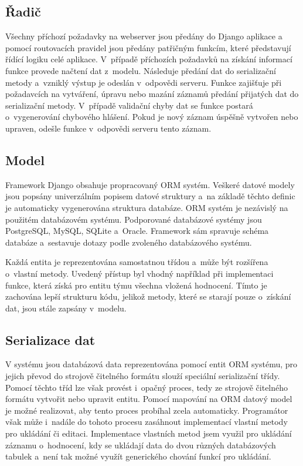 \documentclass[
  digital,
  twoside,
  table, 
  nolof, 
  nolot
]{fithesis3}
\begin{document}
\subsection{Řadič}
\label{radic}
Všechny příchozí požadavky na webserver jsou předány do Django aplikace a pomocí routovacích pravidel jsou předány patřičným funkcím, které představují řídící logiku celé aplikace. V~případě příchozích požadavků na získání informací funkce provede načtení dat z~modelu. Následuje předání dat do serializační metody a~vzniklý výstup je odeslán v~odpovědi serveru. Funkce zajišťuje při požadavcích na vytváření, úpravu nebo mazání záznamů předání přijatých dat do serializační metody. V~případě validační chyby dat se funkce postará o~vygenerování chybového hlášení. Pokud je nový záznam úspěšně vytvořen nebo upraven, odešle funkce v~odpovědi serveru tento záznam.

\subsection{Model}
\label{model}
Framework Django obsahuje propracovaný ORM systém. Veškeré datové modely jsou popsány univerzálním popisem datové struktury a~na základě těchto definic je automaticky vygenerována struktura databáze. ORM systém je nezávislý na použitém databázovém systému. Podporované databázové systémy jsou PostgreSQL, MySQL, SQLite a~Oracle. Framework sám spravuje schéma databáze a~sestavuje dotazy podle zvoleného databázového systému.

Každá entita je reprezentována samostatnou třídou a~může být rozšířena o~vlastní metody. Uvedený přístup byl vhodný například při implementaci funkce, která získá pro entitu týmu všechna vložená hodnocení. Tímto je zachována lepší strukturu kódu, jelikož metody, které se starají pouze o~získání dat, jsou stále zapsány v~modelu.

\subsection{Serializace dat}
\label{serializer}
V systému jsou databázová data reprezentována pomocí entit ORM systému, pro jejich převod do strojově čitelného formátu slouží speciální serializační třídy. Pomocí těchto tříd lze však provést i~opačný proces, tedy ze strojově čitelného formátu vytvořit nebo upravit entitu. Pomocí mapování na ORM datový model je možné realizovat, aby tento proces probíhal zcela automaticky. Programátor však může i~nadále do tohoto procesu zasáhnout implementací vlastní metody pro ukládání či editaci. Implementace vlastních metod jsem využil pro ukládání záznamu o~hodnocení, kdy se ukládají data do dvou různých databázových tabulek a~není tak možné využít generického chování funkcí pro ukládání.
\end{document}
